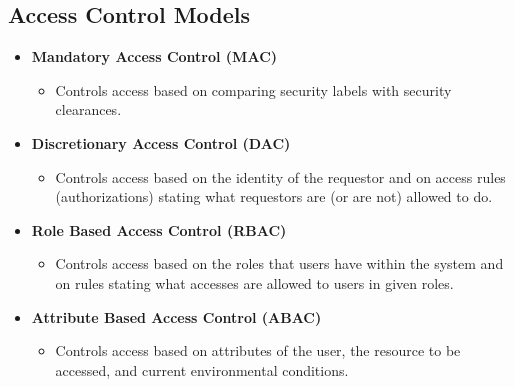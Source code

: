\subsection{Access Control Models}
\begin{itemize}
    \item \textbf{Mandatory Access Control (MAC)}
    \begin{itemize}
        \item Controls access based on comparing security labels with security clearances.\\
    \end{itemize}
    \item \textbf{Discretionary Access Control (DAC)}
    \begin{itemize}
        \item Controls access based on the identity of the requestor and on access rules (authorizations) stating what requestors are (or are not) allowed to do.\\
    \end{itemize}
    \item \textbf{Role Based Access Control (RBAC)}
    \begin{itemize}
        \item Controls access based on the roles that users have within the system and on rules stating what accesses are allowed to users in given roles.\\
    \end{itemize}
    \item \textbf{Attribute Based Access Control (ABAC)}
    \begin{itemize}
        \item Controls access based on attributes of the user, the resource to be accessed, and current environmental conditions.
    \end{itemize}
\end{itemize}

